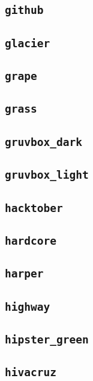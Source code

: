 \subsection{\texttt{github}}
\newpage
\subsection{\texttt{glacier}}
\newpage
\subsection{\texttt{grape}}
\newpage
\subsection{\texttt{grass}}
\newpage
\subsection{\texttt{gruvbox\_dark}}
\newpage
\subsection{\texttt{gruvbox\_light}}
\newpage
\subsection{\texttt{hacktober}}
\newpage
\subsection{\texttt{hardcore}}
\newpage
\subsection{\texttt{harper}}
\newpage
\subsection{\texttt{highway}}
\newpage
\subsection{\texttt{hipster\_green}}
\newpage
\subsection{\texttt{hivacruz}}
\newpage

